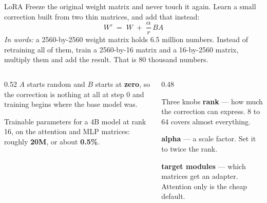 \documentclass[aspectratio=169,10pt]{beamer}
\begin{document}
\begin{frame}[shrink=6]{LoRA}
  Freeze the original weight matrix and never touch it again. Learn a small
  correction built from two thin matrices, and add that instead:
  \[
    W' \;=\; W \;+\; \frac{\alpha}{r}\, B A
  \]
  \emph{In words:} a 2560-by-2560 weight matrix holds 6.5 million numbers.
  Instead of retraining all of them, train a 2560-by-16 matrix and a
  16-by-2560 matrix, multiply them and add the result. That is 80 thousand
  numbers.

  \begin{columns}[T]
    \begin{column}{0.52\textwidth}
      \small
      $A$ starts random and $B$ starts at \textbf{zero}, so the correction is
      nothing at all at step 0 and training begins where the base model was.
      \vspace{0.4em}

      Trainable parameters for a 4B model at rank 16, on the attention and MLP
      matrices: roughly \textbf{20M}, or about \textbf{0.5\%}.
    \end{column}
    \begin{column}{0.48\textwidth}
      \begin{block}{Three knobs}
        \small
        \textbf{rank} --- how much the correction can express. 8 to 64 covers
        almost everything.

        \textbf{alpha} --- a scale factor. Set it to twice the rank.

        \textbf{target modules} --- which matrices get an adapter. Attention
        only is the cheap default.
      \end{block}
    \end{column}
  \end{columns}
\end{frame}
\end{document}
